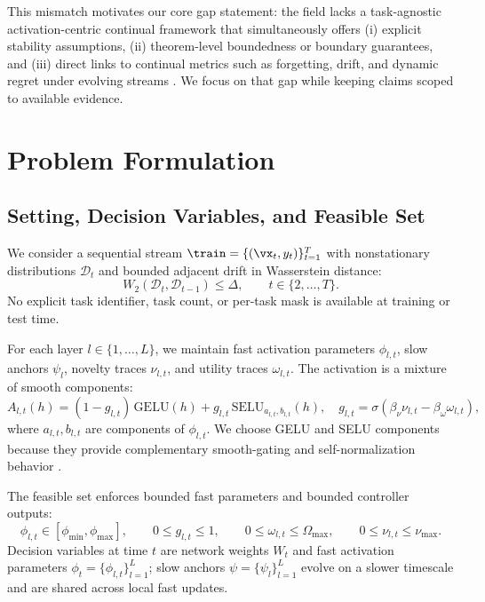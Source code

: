 \documentclass{article} %
\begin{document}
This mismatch motivates our core gap statement: the field lacks a task-agnostic activation-centric continual framework that simultaneously offers (i) explicit stability assumptions, (ii) theorem-level boundedness or boundary guarantees, and (iii) direct links to continual metrics such as forgetting, drift, and dynamic regret under evolving streams \citep{s17,s18,s30}. We focus on that gap while keeping claims scoped to available evidence.

\section{Problem Formulation}
\subsection{Setting, Decision Variables, and Feasible Set}
We consider a sequential stream $\train=\{(\vx_t,y_t)\}_{t=1}^T$ with nonstationary distributions $\mathcal{D}_t$ and bounded adjacent drift in Wasserstein distance:
\begin{equation}
W_2(\mathcal{D}_t,\mathcal{D}_{t-1}) \leq \Delta, \qquad t \in \{2,\ldots,T\}.\label{eq:drift}
\end{equation}
No explicit task identifier, task count, or per-task mask is available at training or test time.

For each layer $l\in\{1,\ldots,L\}$, we maintain fast activation parameters $\phi_{l,t}$, slow anchors $\psi_l$, novelty traces $\nu_{l,t}$, and utility traces $\omega_{l,t}$. The activation is a mixture of smooth components:
\begin{equation}
A_{l,t}(h)=\left(1-g_{l,t}\right)\,\mathrm{GELU}(h)+g_{l,t}\,\mathrm{SELU}_{a_{l,t},b_{l,t}}(h),
\quad g_{l,t}=\sigma\!\left(\beta_\nu \nu_{l,t}-\beta_\omega \omega_{l,t}\right),
\label{eq:activation_mix}
\end{equation}
where $a_{l,t},b_{l,t}$ are components of $\phi_{l,t}$. We choose GELU and SELU components because they provide complementary smooth-gating and self-normalization behavior \citep{s21,s22}.

The feasible set enforces bounded fast parameters and bounded controller outputs:
\begin{equation}
\phi_{l,t}\in[\phi_{\min},\phi_{\max}],\qquad 0\le g_{l,t}\le 1,\qquad 0\le \omega_{l,t}\le \Omega_{\max},\qquad 0\le \nu_{l,t}\le \nu_{\max}.
\label{eq:feasible_set}
\end{equation}
Decision variables at time $t$ are network weights $W_t$ and fast activation parameters $\phi_t=\{\phi_{l,t}\}_{l=1}^L$; slow anchors $\psi=\{\psi_l\}_{l=1}^L$ evolve on a slower timescale and are shared across local fast updates.
\end{document}
